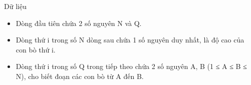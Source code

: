 Dữ liệu
\begin{itemize}
	\item     Dòng đầu tiên chứa 2 số nguyên N và Q.   
	\item     Dòng thứ i trong số N dòng sau chứa 1 số nguyên duy nhất, là độ cao của con bò thứ i.   
	\item     Dòng thứ i trong số Q trong tiếp theo chứa 2 số nguyên A, B (1 ≤ A ≤ B ≤ N), cho biết đoạn các con bò từ A đến B.   
\end{itemize}